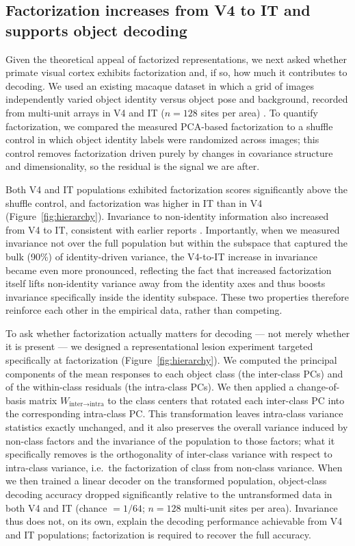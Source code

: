 \documentclass[11pt]{article}
\begin{document}
\subsection{Factorization increases from V4 to IT and supports object decoding}

Given the theoretical appeal of factorized representations, we next asked
whether primate visual cortex exhibits factorization and, if so, how much it
contributes to decoding. We used an existing macaque dataset in which a
grid of images independently varied object identity versus object pose and
background, recorded from multi-unit arrays in V4 and IT (\(n=128\) sites
per area) \citep{majaj2015simple, hong2016explicit}. To quantify
factorization, we compared the measured PCA-based factorization to a shuffle
control in which object identity labels were randomized across images; this
control removes factorization driven purely by changes in covariance
structure and dimensionality, so the residual is the signal we are after.

Both V4 and IT populations exhibited factorization scores significantly
above the shuffle control, and factorization was higher in IT than in V4
(Figure~\ref{fig:hierarchy}). Invariance to non-identity information also
increased from V4 to IT, consistent with earlier reports
\citep{rust2012balanced}. Importantly, when we measured invariance not over
the full population but within the subspace that captured the bulk (90\%)
of identity-driven variance, the V4-to-IT increase in invariance became even
more pronounced, reflecting the fact that increased factorization itself
lifts non-identity variance away from the identity axes and thus boosts
invariance specifically inside the identity subspace. These two properties
therefore reinforce each other in the empirical data, rather than competing.

To ask whether factorization actually matters for decoding --- not merely
whether it is present --- we designed a representational lesion experiment
targeted specifically at factorization (Figure~\ref{fig:hierarchy}). We
computed the principal components of the mean responses to each object class
(the inter-class PCs) and of the within-class residuals (the intra-class
PCs). We then applied a change-of-basis matrix \(W_{\text{inter}\to\text{intra}}\)
to the class centers that rotated each inter-class PC into the
corresponding intra-class PC. This transformation leaves intra-class
variance statistics exactly unchanged, and it also preserves the overall
variance induced by non-class factors and the invariance of the population
to those factors; what it specifically removes is the orthogonality of
inter-class variance with respect to intra-class variance, i.e.\ the
factorization of class from non-class variance. When we then trained a
linear decoder on the transformed population, object-class decoding accuracy
dropped significantly relative to the untransformed data in both V4 and IT
(chance \(=1/64\); \(n=128\) multi-unit sites per area). Invariance thus
does not, on its own, explain the decoding performance achievable from V4
and IT populations; factorization is required to recover the full accuracy.
\end{document}
